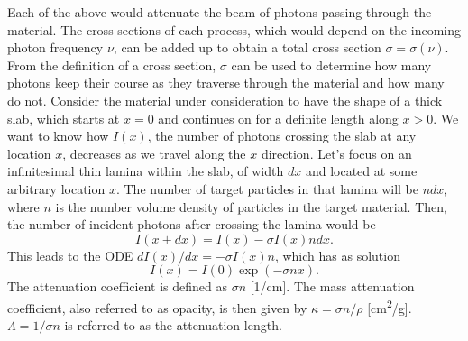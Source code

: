 \documentclass[a4paper,11pt]{report}
\begin{document}
Each of the above would attenuate the beam of photons passing through the material. The cross-sections of each process, which would depend on the incoming photon frequency $\nu$, can be added up to obtain a total cross section $\sigma = \sigma(\nu)$. From the definition of a cross section, $\sigma$ can be used to determine how many photons keep their course as they traverse through the material and how many do not. Consider the material under consideration to have the shape of a thick slab, which starts at $x=0$ and continues on for a definite length along $x>0$. We want to know how $I(x)$, the number of photons crossing the slab at any location $x$, decreases as we travel along the $x$ direction. Let's focus on an infinitesimal thin lamina within the slab, of width $dx$ and located at some arbitrary location $x$. The number of target particles in that lamina will be $n dx$, where $n$ is the number volume density of particles in the target material. Then, the number of incident photons after crossing the lamina would be
\begin{equation}
    I(x+dx) = I(x) -\sigma I(x) n dx.
\end{equation}
This leads to the ODE $dI(x)/dx = -\sigma I(x) n$, which has as solution
\begin{equation}
    I(x) = I(0) \exp(-\sigma n x).
\end{equation}
The attenuation coefficient is defined as $\sigma n$ [1/cm]. The mass attenuation coefficient, also referred to as opacity, is then given by $\kappa = \sigma n / \rho$ [cm\textsuperscript{2}/g]. $\Lambda = 1 / \sigma n$ is referred to as the attenuation length. 
\end{document}
